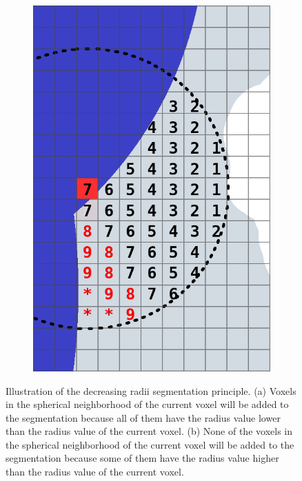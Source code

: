 \documentclass[review]{elsarticle}
\begin{document}
\begin{figure}[t]
\begin{subfigure}[b]{.30\linewidth}
    \includegraphics[width=\textwidth]{fig6b.png}
    \label{fig:notadded}
    \caption{}%
  \end{subfigure}
  \caption{Illustration of the decreasing radii segmentation principle. 
  (a) Voxels in the spherical neighborhood of the current voxel will be added to 
  the segmentation because all of them have the radius value lower than the radius 
  value of the current voxel.  (b) None of the voxels in the spherical neighborhood 
  of the current voxel will be added to the segmentation because some of them 
  have the radius value higher than the radius value of the current voxel.}
  \label{fig:decreasing_conditions}
\end{figure}
\end{document}
